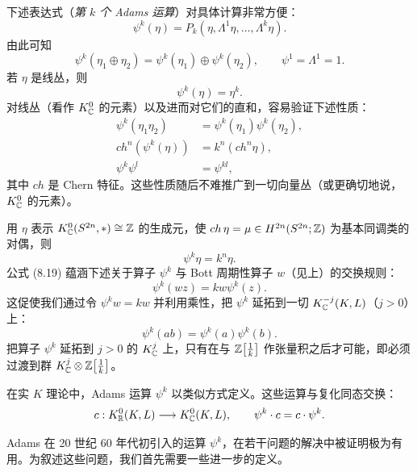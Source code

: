 下述表达式（\emph{第 $k$ 个 Adams 运算}）对具体计算非常方便：
\[
\psi^k(\eta)=P_k(\eta,\Lambda^1\eta,\dots,\Lambda^k\eta).
\]
由此可知
\begin{equation}
\psi^k(\eta_1\oplus\eta_2)=\psi^k(\eta_1)\oplus\psi^k(\eta_2),\qquad \psi^1=\Lambda^1=1. \tag{8.16}
\end{equation}
若 $\eta$ 是线丛，则
\begin{equation}
\psi^k(\eta)=\eta^k. \tag{8.17}
\end{equation}
对线丛（看作 $K_{\mathbb{C}}^0$ 的元素）以及进而对它们的直和，容易验证下述性质：
\begin{equation}
\begin{aligned}
\psi^k(\eta_1\eta_2)&=\psi^k(\eta_1)\psi^k(\eta_2),\\
ch^n(\psi^k(\eta))&=k^n(ch^n\eta),\\
\psi^k\psi^l&=\psi^{kl},
\end{aligned}
\tag{8.18}
\end{equation}
其中 $ch$ 是 Chern 特征。这些性质随后不难推广到一切向量丛（或更确切地说，$K_{\mathbb{C}}^0$ 的元素）。

用 $\eta$ 表示 $K_{\mathbb{C}}^0(S^{2n},*)\cong\mathbb{Z}$ 的生成元，使 $ch\,\eta=\mu\in H^{2n}(S^{2n};\mathbb{Z})$ 为基本同调类的对偶，则
\begin{equation}
\psi^k\eta=k^n\eta. \tag{8.19}
\end{equation}
公式 (8.19) 蕴涵下述关于算子 $\psi^k$ 与 Bott 周期性算子 $w$（见上）的交换规则：
\[
\psi^k(wz)=kw\psi^k(z).
\]
这促使我们通过令 $\psi^kw=kw$ 并利用乘性，把 $\psi^k$ 延拓到一切 $K_{\mathbb{C}}^{-j}(K,L)$（$j>0$）上：
\[
\psi^k(ab)=\psi^k(a)\psi^k(b).
\]
把算子 $\psi^k$ 延拓到 $j>0$ 的 $K_{\mathbb{C}}^j$ 上，只有在与 $\mathbb{Z}\bigl[\tfrac1k\bigr]$ 作张量积之后才可能，即必须过渡到群 $K_{\mathbb{C}}^j\otimes\mathbb{Z}\bigl[\tfrac1k\bigr]$。

在实 $K$ 理论中，Adams 运算 $\psi^k$ 以类似方式定义。这些运算与复化同态交换：
\[
c:K_{\mathbb{R}}^0(K,L)\longrightarrow K_{\mathbb{C}}^0(K,L),\qquad \psi^k\cdot c=c\cdot\psi^k.
\]

Adams 在 20 世纪 60 年代初引入的运算 $\psi^k$，在若干问题的解决中被证明极为有用。为叙述这些问题，我们首先需要一些进一步的定义。

